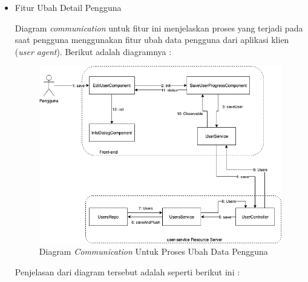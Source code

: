 \documentclass[pdftex,12pt, oneside]{article}
\begin{document}
\begin{itemize}
	\item Fitur Ubah Detail Pengguna
	
	Diagram \textit{communication} untuk fitur ini menjelaskan proses yang terjadi pada saat pengguna menggunakan fitur ubah data pengguna dari aplikasi klien (\textit{user agent}). Berikut adalah diagramnya :
	
	\begin{figure}[H]
		\centering
		\includegraphics[width=1\textwidth]{./resources/comm-dia-update-user}
		\caption{Diagram \textit{Communication} Untuk Proses Ubah Data Pengguna}
		\label{fig:comm-dia-update-user}
	\end{figure}
	
	Penjelasan dari diagram tersebut adalah seperti berikut ini :
	

\end{itemize}
\end{document}

